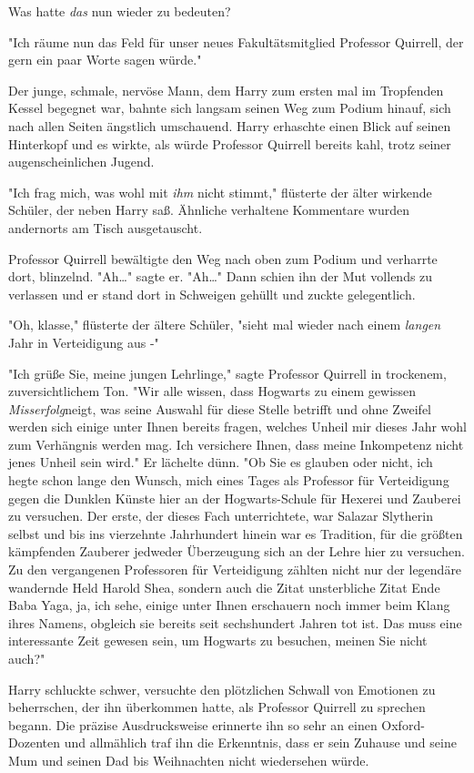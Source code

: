 {Was hatte \emph{das} nun wieder zu bedeuten?

"Ich räume nun das Feld für unser neues Fakultätsmitglied Professor Quirrell, der gern ein paar Worte sagen würde."

Der junge, schmale, nervöse Mann, dem Harry zum ersten mal im Tropfenden Kessel begegnet war, bahnte sich langsam seinen Weg zum Podium hinauf, sich nach allen Seiten ängstlich umschauend. Harry erhaschte einen Blick auf seinen Hinterkopf und es wirkte, als würde Professor Quirrell bereits kahl, trotz seiner augenscheinlichen Jugend.

"Ich frag mich, was wohl mit \emph{ihm} nicht stimmt," flüsterte der älter wirkende Schüler, der neben Harry saß. Ähnliche verhaltene Kommentare wurden andernorts am Tisch ausgetauscht.

Professor Quirrell bewältigte den Weg nach oben zum Podium und verharrte dort, blinzelnd. "Ah…" sagte er. "Ah…" Dann schien ihn der Mut vollends zu verlassen und er stand dort in Schweigen gehüllt und zuckte gelegentlich.

"Oh, klasse," flüsterte der ältere Schüler, "sieht mal wieder nach einem \emph{langen} Jahr in Verteidigung aus -"

"Ich grüße Sie, meine jungen Lehrlinge," sagte Professor Quirrell in trockenem, zuversichtlichem Ton. "Wir alle wissen, dass Hogwarts zu einem gewissen \emph{Misserfolg}neigt, was seine Auswahl für diese Stelle betrifft und ohne Zweifel werden sich einige unter Ihnen bereits fragen, welches Unheil mir dieses Jahr wohl zum Verhängnis werden mag. Ich versichere Ihnen, dass meine Inkompetenz nicht jenes Unheil sein wird." Er lächelte dünn. "Ob Sie es glauben oder nicht, ich hegte schon lange den Wunsch, mich eines Tages als Professor für Verteidigung gegen die Dunklen Künste hier an der Hogwarts-Schule für Hexerei und Zauberei zu versuchen. Der erste, der dieses Fach unterrichtete, war Salazar Slytherin selbst und bis ins vierzehnte Jahrhundert hinein war es Tradition, für die größten kämpfenden Zauberer jedweder Überzeugung sich an der Lehre hier zu versuchen. Zu den vergangenen Professoren für Verteidigung zählten nicht nur der legendäre wandernde Held Harold Shea, sondern auch die Zitat unsterbliche Zitat Ende Baba Yaga, ja, ich sehe, einige unter Ihnen erschauern noch immer beim Klang ihres Namens, obgleich sie bereits seit sechshundert Jahren tot ist. Das muss eine interessante Zeit gewesen sein, um Hogwarts zu besuchen, meinen Sie nicht auch?"

Harry schluckte schwer, versuchte den plötzlichen Schwall von Emotionen zu beherrschen, der ihn überkommen hatte, als Professor Quirrell zu sprechen begann. Die präzise Ausdrucksweise erinnerte ihn so sehr an einen Oxford-Dozenten und allmählich traf ihn die Erkenntnis, dass er sein Zuhause und seine Mum und seinen Dad bis Weihnachten nicht wiedersehen würde.

}
